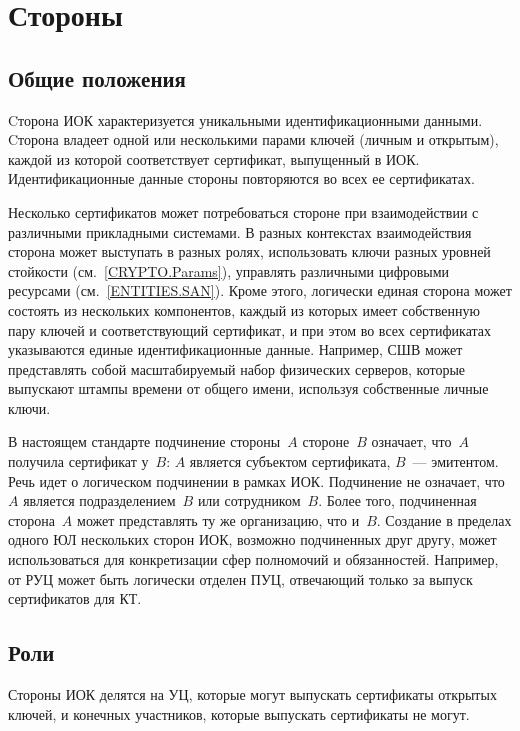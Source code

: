 \chapter{Стороны}\label{ENTITIES}

\section{Общие положения}\label{ENTITIES.Common}

Cторона ИОК характеризуется уникальными идентификационными данными.
%
Cторона владеет одной или несколькими парами ключей (личным и открытым),
каждой из которой соответствует сертификат, выпущенный в ИОК. 
%
Идентификационные данные стороны повторяются во всех ее сертификатах.

Несколько сертификатов может потребоваться стороне при взаимодействии 
с различными прикладными системами. В разных контекстах взаимодействия
сторона может выступать в разных ролях, 
использовать ключи разных уровней стойкости (см.~\ref{CRYPTO.Params}), 
управлять различными цифровыми ресурсами (см.~\ref{ENTITIES.SAN}). 
%
Кроме этого, логически единая сторона может состоять из нескольких 
компонентов, каждый из которых имеет собственную пару ключей 
и соответствующий сертификат, и при этом во всех сертификатах указываются 
единые идентификационные данные.
%
Например, СШВ может представлять собой масштабируемый набор физических серверов, 
которые выпускают штампы времени от общего имени, используя собственные личные ключи.

В настоящем стандарте
подчинение стороны~$A$ стороне~$B$ означает, что~$A$ получила сертификат 
у~$B$: $A$ является субъектом сертификата, $B$~--- эмитентом.
%
Речь идет о логическом подчинении в рамках ИОК.
Подчинение не означает, что~$A$ является подразделением~$B$ или сотрудником~$B$. 
Более того, подчиненная сторона~$A$ может представлять ту же организацию, 
что и~$B$.
%
Создание в пределах одного ЮЛ нескольких сторон ИОК, 
возможно подчиненных друг другу, может использоваться для конкретизации 
сфер полномочий и обязанностей.
%
Например, от РУЦ может быть логически отделен ПУЦ, 
отвечающий только за выпуск сертификатов для КТ.

\section{Роли}

Стороны ИОК делятся на УЦ, которые могут выпускать сертификаты открытых ключей, 
и конечных участников, которые выпускать сертификаты не могут.


